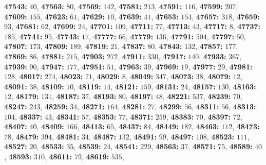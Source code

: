 \textsf{\bfseries 47543:} $40$, \textsf{\bfseries 47563:} $80$, \textsf{\bfseries 47569:} $142$, \textsf{\bfseries 47581:} $213$, \textsf{\bfseries 47591:} $116$, \textsf{\bfseries 47599:} $207$, \textsf{\bfseries 47609:} $155$, \textsf{\bfseries 47623:} $61$, \textsf{\bfseries 47629:} $10$, \textsf{\bfseries 47639:} $41$, \textsf{\bfseries 47653:} $154$, \textsf{\bfseries 47657:} $318$, \textsf{\bfseries 47659:} $93$, \textsf{\bfseries 47681:} $62$, \textsf{\bfseries 47699:} $24$, \textsf{\bfseries 47701:} $109$, \textsf{\bfseries 47711:} $77$, \textsf{\bfseries 47713:} $43$, \textsf{\bfseries 47717:} $8$, \textsf{\bfseries 47737:} $185$, \textsf{\bfseries 47741:} $95$, \textsf{\bfseries 47743:} $17$, \textsf{\bfseries 47777:} $66$, \textsf{\bfseries 47779:} $136$, \textsf{\bfseries 47791:} $504$, \textsf{\bfseries 47797:} $50$, \textsf{\bfseries 47807:} $173$, \textsf{\bfseries 47809:} $189$, \textsf{\bfseries 47819:} $21$, \textsf{\bfseries 47837:} $80$, \textsf{\bfseries 47843:} $132$, \textsf{\bfseries 47857:} $177$, \textsf{\bfseries 47869:} $86$, \textsf{\bfseries 47881:} $215$, \textsf{\bfseries 47903:} $272$, \textsf{\bfseries 47911:} $330$, \textsf{\bfseries 47917:} $140$, \textsf{\bfseries 47933:} $367$, \textsf{\bfseries 47939:} $90$, \textsf{\bfseries 47947:} $177$, \textsf{\bfseries 47951:} $51$, \textsf{\bfseries 47963:} $39$, \textsf{\bfseries 47969:} $19$, \textsf{\bfseries 47977:} $29$, \textsf{\bfseries 47981:} $128$, \textsf{\bfseries 48017:} $274$, \textsf{\bfseries 48023:} $71$, \textsf{\bfseries 48029:} $8$, \textsf{\bfseries 48049:} $347$, \textsf{\bfseries 48073:} $38$, \textsf{\bfseries 48079:} $12$, \textsf{\bfseries 48091:} $38$, \textsf{\bfseries 48109:} $10$, \textsf{\bfseries 48119:} $14$, \textsf{\bfseries 48121:} $159$, \textsf{\bfseries 48131:} $24$, \textsf{\bfseries 48157:} $130$, \textsf{\bfseries 48163:} $12$, \textsf{\bfseries 48179:} $131$, \textsf{\bfseries 48187:} $37$, \textsf{\bfseries 48193:} $80$, \textsf{\bfseries 48197:} $48$, \textsf{\bfseries 48221:} $537$, \textsf{\bfseries 48239:} $70$, \textsf{\bfseries 48247:} $243$, \textsf{\bfseries 48259:} $34$, \textsf{\bfseries 48271:} $164$, \textsf{\bfseries 48281:} $27$, \textsf{\bfseries 48299:} $56$, \textsf{\bfseries 48311:} $56$, \textsf{\bfseries 48313:} $104$, \textsf{\bfseries 48337:} $43$, \textsf{\bfseries 48341:} $57$, \textsf{\bfseries 48353:} $77$, \textsf{\bfseries 48371:} $259$, \textsf{\bfseries 48383:} $70$, \textsf{\bfseries 48397:} $72$, \textsf{\bfseries 48407:} $40$, \textsf{\bfseries 48409:} $166$, \textsf{\bfseries 48413:} $65$, \textsf{\bfseries 48437:} $84$, \textsf{\bfseries 48449:} $182$, \textsf{\bfseries 48463:} $112$, \textsf{\bfseries 48473:} $78$, \textsf{\bfseries 48479:} $394$, \textsf{\bfseries 48481:} $34$, \textsf{\bfseries 48487:} $132$, \textsf{\bfseries 48491:} $99$, \textsf{\bfseries 48497:} $108$, \textsf{\bfseries 48523:} $111$, \textsf{\bfseries 48527:} $20$, \textsf{\bfseries 48533:} $35$, \textsf{\bfseries 48539:} $24$, \textsf{\bfseries 48541:} $229$, \textsf{\bfseries 48563:} $37$, \textsf{\bfseries 48571:} $75$, \textsf{\bfseries 48589:} $40$, \textsf{\bfseries 48593:} $310$, \textsf{\bfseries 48611:} $79$, \textsf{\bfseries 48619:} $535$, 
